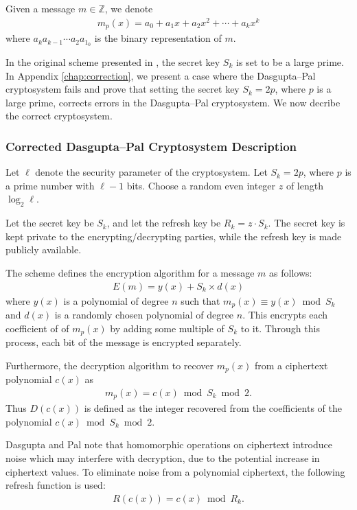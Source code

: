Given a message $m \in \mathbb{Z}$, we denote
\begin{align*}
		m_p(x) = a_0 + a_1x + a_2x^2 + \cdots + a_kx^k
\end{align*}
where $a_ka_{k-1}\cdots a_2a_1_0$ is the binary representation of $m$.

In the original scheme presented in \cite{dasgupta_design_2016}, the secret key $S_k$ is set to be a large prime. In Appendix \ref{chap:correction}, we present a case where the Dasgupta--Pal cryptosystem fails and prove that setting the secret key $S_k = 2p$, where $p$ is a large prime, corrects errors in the Dasgupta--Pal cryptosystem.
We now decribe the correct cryptosystem.
\subsubsection{Corrected Dasgupta--Pal Cryptosystem Description}
Let $\ell$ denote the security parameter of the cryptosystem.
Let $S_k = 2p$, where $p$ is a prime number with $\ell - 1$ bits.
Choose a random even integer $z$ of length $\log_2{\ell}$.

Let the secret key be $S_k$, and let the refresh key be $R_k = z \cdot S_k$. The secret key is kept private to the encrypting/decrypting parties, while the refresh key is made publicly available.

The scheme defines the encryption algorithm for a message $m$ as follows:
\begin{align*}
	E(m) = y(x) + S_k\times d(x)
\end{align*}
where
$y(x)$ is a polynomial of degree $n$ such that $m_p(x) \equiv y(x) \bmod S_k$ and $d(x)$ is a randomly chosen polynomial of degree $n$. This encrypts each coefficient of of $m_p(x)$ by adding some multiple of $S_k$ to it. Through this process, each bit of the message is encrypted separately.

Furthermore, the decryption algorithm to recover $m_p(x)$ from a ciphertext polynomial $c(x)$ as
\begin{align*}
	m_p(x) = c(x) \bmod S_k \bmod 2.
\end{align*}
Thus $D(c(x))$ is defined as the integer recovered from the coefficients of the polynomial $c(x) \bmod S_k \bmod 2$.

Dasgupta and Pal note that homomorphic operations on ciphertext introduce noise which may interfere with decryption, due to the potential increase in ciphertext values.
To eliminate noise from a polynomial ciphertext, the following refresh function is used:
\begin{align*}
	R(c(x)) = c(x) \bmod R_k.
\end{align*}

